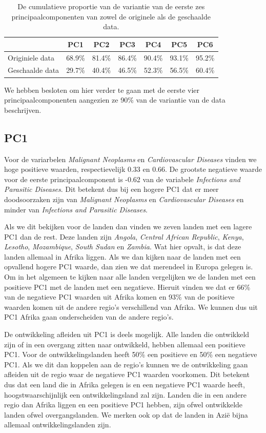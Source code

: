 \documentclass[a4paper,kulak]{kulakarticle}
\begin{document}
\begin{table}[ht]
	\centering
\begin{tabular}{lcccccc}
	\hline 
	& PC1 & PC2 & PC3 & PC4 & PC5 & PC6 \\ 
	\hline 
	Originiele data & 68.9\% & 81.4\% & 86.4\% & 90.4\% & 93.1\% & 95.2\% \\ 
	Geschaalde data & 29.7\% & 40.4\% & 46.5\% & 52.3\% & 56.5\% & 60.4\%\\ 
	\hline 
\end{tabular} 
\caption{De cumulatieve proportie van de variantie van de eerste zes principaalcomponenten van zowel de originele als de geschaalde data.}
\label{table:pcaScaledVSNot}
\end{table}

We hebben besloten om hier verder te gaan met de eerste vier principaalcomponenten aangezien ze 90\% van de variantie van de data beschrijven. 

\subsection{PC1}
Voor de variarbelen \textit{Malignant Neoplasms} en \textit{Cardiovascular Diseases} vinden we hoge positieve waarden, respectievelijk 0.33 en 0.66. De grootste negatieve waarde voor de eerste principaalcomponent is -0.62 van de variabele \textit{Infections and Parasitic Diseases}. Dit betekent dus bij een hogere PC1 dat er meer doodsoorzaken zijn van \textit{Malignant Neoplasms} en \textit{Cardiovascular Diseases} en minder van \textit{Infections and Parasitic Diseases}. 

Als we dit bekijken voor de landen dan vinden we zeven landen met een lagere PC1 dan de rest. Deze landen zijn \textit{Angola}, \textit{Central African Republic}, \textit{Kenya}, \textit{Lesotho}, \textit{Mozambique}, \textit{South Sudan} en \textit{Zambia}. Wat hier opvalt, is dat deze landen allemaal in Afrika liggen. Als we dan kijken naar de landen met een opvallend hogere PC1 waarde, dan zien we dat merendeel in Europa gelegen is. Om in het algemeen te kijken naar alle landen vergelijken we de landen met een positieve PC1 met de landen met een negatieve. Hieruit vinden we dat er 66\% van de negatieve PC1 waarden uit Afrika komen en 93\% van de positieve waarden komen uit de andere regio's verschillend van Afrika. We kunnen dus uit PC1 Afrika gaan onderscheiden van de andere regio's.

De ontwikkeling afleiden uit PC1 is deels mogelijk. Alle landen die ontwikkeld zijn of in een overgang zitten naar ontwikkeld, hebben allemaal een positieve PC1. Voor de ontwikkelingslanden heeft 50\% een positieve en 50\% een negatieve PC1. Als we dit dan koppelen aan de regio's kunnen we de ontwikkeling gaan afleiden uit de regio waar de negatieve PC1 waarden voorkomen. Dit betekent dus dat een land die in Afrika gelegen is en een negatieve PC1 waarde heeft, hoogstwaarschijnlijk een ontwikkelingsland zal zijn. Landen die in een andere regio dan Afrika liggen en een positieve PC1 hebben, zijn ofwel ontwikkelde landen ofwel overgangslanden. We merken ook op dat de landen in Azi\"e bijna allemaal ontwikkelingslanden zijn. 
\end{document}
